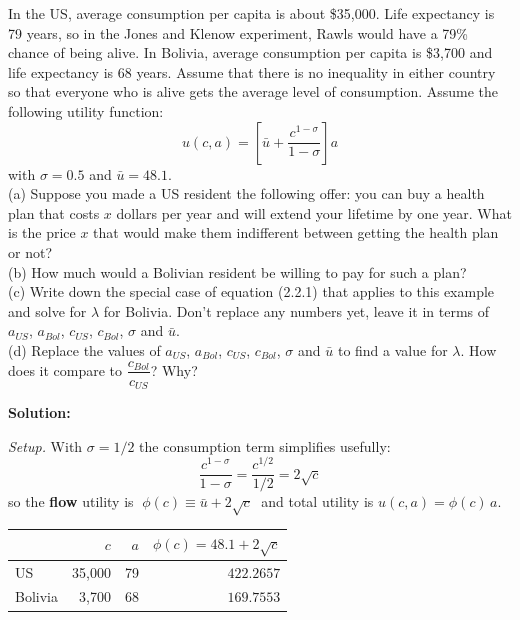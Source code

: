 \documentclass[12pt, letterpaper]{article}
\begin{document}
\begin{tcolorbox}[evenbox,title={Problem 2.6 \quad The Value of Life Expectancy}]
\begin{tcolorbox}[questionbox]
In the US, average consumption per capita is about \$35,000. Life expectancy is 79 years, so
in the Jones and Klenow experiment, Rawls would have a 79\% chance of being alive. In
Bolivia, average consumption per capita is \$3,700 and life expectancy is 68 years. Assume
that there is no inequality in either country so that everyone who is alive gets the average
level of consumption. Assume the following utility function:
$$u(c,a) = \left[\bar u + \frac{c^{1-\sigma}}{1-\sigma}\right] a$$
with $\sigma = 0.5$ and $\bar u = 48.1$.\\[3pt]
(a) Suppose you made a US resident the following offer: you can buy a health plan that costs
$x$ dollars per year and will extend your lifetime by one year. What is the price $x$ that
would make them indifferent between getting the health plan or not?\\
(b) How much would a Bolivian resident be willing to pay for such a plan?\\
(c) Write down the special case of equation (2.2.1) that applies to this example and solve
for $\lambda$ for Bolivia. Don't replace any numbers yet, leave it in terms of $a_{US}$,
$a_{Bol}$, $c_{US}$, $c_{Bol}$, $\sigma$ and $\bar u$.\\
(d) Replace the values of $a_{US}$, $a_{Bol}$, $c_{US}$, $c_{Bol}$, $\sigma$ and $\bar u$ to
find a value for $\lambda$. How does it compare to $\dfrac{c_{Bol}}{c_{US}}$? Why?
\end{tcolorbox}

\textbf{Solution:}

\emph{Setup.} With $\sigma = 1/2$ the consumption term simplifies usefully:
$$\frac{c^{1-\sigma}}{1-\sigma} = \frac{c^{1/2}}{1/2} = 2\sqrt{c}$$
so the \textbf{flow} utility is $\;\phi(c) \equiv \bar u + 2\sqrt{c}\;$ and total utility is
$u(c,a) = \phi(c)\,a$.

\begin{center}
\begin{tabular}{lrrr}
\toprule
& $c$ & $a$ & $\phi(c) = 48.1 + 2\sqrt{c}$ \\
\midrule
US      & 35,000 & 79 & $422.2657$ \\
Bolivia &  3,700 & 68 & $169.7553$ \\
\bottomrule
\end{tabular}
\end{center}


\end{tcolorbox}
\end{document}
